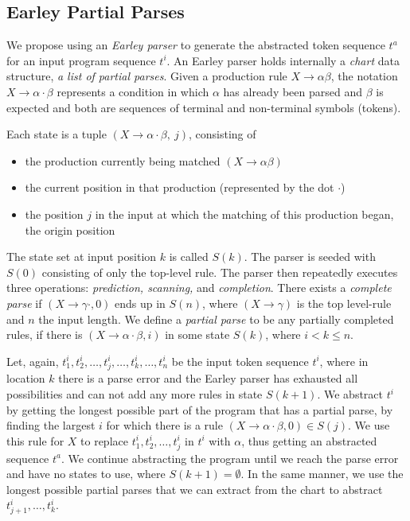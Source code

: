 \subsection{Earley Partial Parses}
\label{sec:prog-abstract:partial}

We propose using an \emph{Earley parser} to generate the abstracted token
sequence $t^a$ for an input program sequence $t^i$. An Earley parser holds
internally a \emph{chart} data structure, \ie \emph{a list of partial parses}.
Given a production rule $X \rightarrow \alpha \beta$, the notation $X
\rightarrow \alpha \cdot \beta$ represents a condition in which $\alpha$ has
already been parsed and $\beta$ is expected and both are sequences of terminal
and non-terminal symbols (tokens).

Each state is a tuple $(X \rightarrow \alpha \cdot \beta,\ j)$, consisting of
\begin{itemize}
    \item the production currently being matched $(X \rightarrow \alpha \beta)$
    \item the current position in that production (represented by the dot
    $\cdot$)
    \item the position $j$ in the input at which the matching of this production
    began, \ie the origin position
\end{itemize}

The state set at input position $k$ is called $S(k)$. The parser is seeded with
$S(0)$ consisting of only the top-level rule. The parser then repeatedly
executes three operations: \emph{prediction, scanning,} and \emph{completion}.
There exists a \emph{complete parse} if $(X \rightarrow \gamma \cdot, 0)$ ends
up in $S(n)$, where $(X \rightarrow \gamma)$ is the top level-rule and $n$ the
input length. We define a \emph{partial parse} to be any partially completed
rules, \ie if there is $(X \rightarrow \alpha \cdot \beta, i)$ in some state
$S(k)$, where $i < k \leq n$.

Let, again, $t^i_1, t^i_2, \dots, t^i_j, \dots, t^i_k, \dots, t^i_n$ be the
input token sequence $t^i$, where in location $k$ there is a parse error and the
Earley parser has exhausted all possibilities and can not add any more rules in
state $S(k + 1)$. We abstract $t^i$ by getting the longest possible part of the
program that has a partial parse, \ie by finding the largest $i$ for which there
is a rule $(X \rightarrow \alpha \cdot \beta, 0) \in S(j)$. We use this rule for
$X$ to replace $t^i_1, t^i_2, \dots, t^i_j$ in $t^i$ with $\alpha$, thus getting
an abstracted sequence $t^a$. We continue abstracting the program until we reach
the parse error and have no states to use, \ie where $S(k + 1) = \emptyset$. In
the same manner, we use the longest possible partial parses that we can extract
from the chart to abstract $t^i_{j+1}, \dots, t^i_k$.


